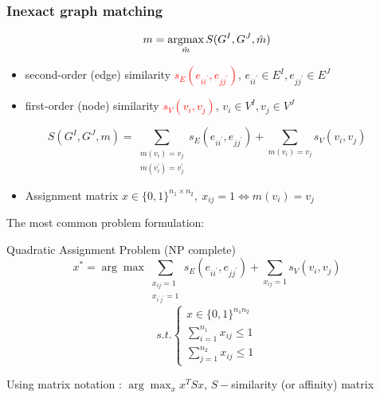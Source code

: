 \documentclass[hyperref={pdfpagelabels=false}]{beamer}
\def\argmax{\mathop{\rm argmax}}						%
\begin{document}
\begin{frame} [allowframebreaks]
\frametitle{Inexact graph matching}
\begin{equation*}
m = \argmax_{\hat{m}}S(G^I, G^J, \hat{m})
\end{equation*}
\begin{itemize}
\item second-order (edge) similarity \textcolor{red}{$s_E(e_{ii^\prime},e_{jj^\prime})$}, $e_{ii^\prime}\in E^I, e_{jj^\prime}\in E^J$
\item first-order (node) similarity \textcolor{red}{$s_V(v_{i},v_{j})$}, $v_i\in V^I, v_j\in V^J$
\end{itemize}

\begin{equation*}
	S(G^I,G^J,m)=\sum_{\substack{m(v_i)=v_j\\m(v_i^{\prime})=v_j^{\prime}}}s_E(e_{ii^\prime},e_{jj^\prime}) + \sum_{m(v_i)=v_j}s_V(v_{i},v_{j})
\end{equation*}

\begin{itemize}
\item Assignment matrix $x\in\{0,1\}^{n_1\times n_2},\ x_{ij}=1\iff m(v_i)=v_j$
\end{itemize}

\framebreak
The most common problem formulation:
\begin{block}{Quadratic Assignment Problem (NP complete)~\cite{Burkard98thequadratic}}
$$x^* = \arg\max \sum_{\substack{x_{ij}=1\\x_{i^\prime j^\prime}=1}}s_E(e_{ii^\prime},e_{jj^\prime}) + \sum_{x_{ij}=1}s_V(v_{i},v_{j}) $$
$$ s.t. \begin{cases}
		x\in\{0,1\}^{n_1n_2} \\
		\sum_{i=1}^{n_1}x_{ij}\le 1 \\
		\sum_{j=1}^{n_2}x_{ij}\le 1
\end{cases}$$
\end{block}
Using matrix notation : $\arg\max_{x}{x^TSx}$, $S-$similarity (or affinity) matrix


\framebreak


\end{frame}
\end{document}
